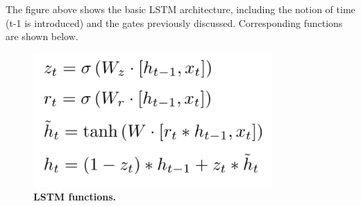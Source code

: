 \documentclass{sig-alternate-05-2015}
\begin{document}
	The figure above shows the basic LSTM architecture, including the notion of time (t-1 is introduced) and the gates previously discussed. Corresponding functions are shown below.
	\begin{figure}[H]
		\centering\includegraphics[scale=0.5]{lstm_functions} 
		\caption{\textbf{ LSTM functions.}}
	\end{figure}
	
\end{document}
